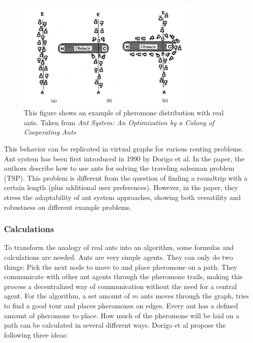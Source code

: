 \begin{figure}[H]
	\begin{centering}
		\includegraphics[width=0.8\textwidth]{bilder/antSystemExampleIllustration.png}
		\caption{This figure shows an example of pheromone distribution with real ants. Taken from \textit{Ant System: An Optimization by a Colony of Cooperating Ants}\cite{dorigo_ant_1996}}
		\label{fig:antSystemExampleIllustration}
	\end{centering}
\end{figure}


This behavior can be replicated in virtual graphs for various routing problems.
Ant system has been first introduced in 1990 by Dorigo et al\cite{dorigo_ant_1996}.
In the paper, the authors describe how to use ants for solving the traveling salesman problem (TSP).
This problem is different from the question of finding a roundtrip with a certain length (plus additional user preferences).
However, in the paper, they stress the adaptability of ant system approaches, showing both versatility and robustness on different example problems\cite{dorigo_ant_1996}.


\subsubsection{Calculations}

To transform the analogy of real ants into an algorithm, some formulas and calculations are needed.
Ants are very simple agents. 
They can only do two things:
Pick the next node to move to and place pheromone on a path.
They communicate with other ant agents through the pheromone trails, making this process a decentralized way of communication without the need for a central agent.
For the algorithm, a set amount of $m$ ants moves through the graph, tries to find a good tour and places pheromones on edges.
Every ant has a defined amount of pheromone to place. 
How much of the pheromone will be laid on a path can be calculated in several different ways. 
Dorigo et al propose the following three ideas\cite{dorigo_ant_1996}:

